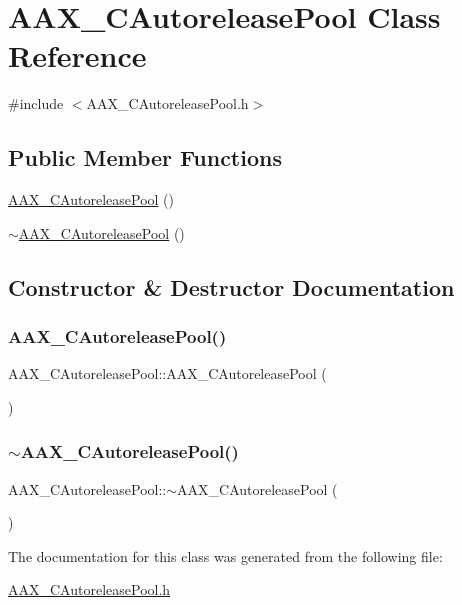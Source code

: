 \hypertarget{a01445}{}\section{A\+A\+X\+\_\+\+C\+Autorelease\+Pool Class Reference}
\label{a01445}


{\ttfamily \#include $<$A\+A\+X\+\_\+\+C\+Autorelease\+Pool.\+h$>$}

\subsection*{Public Member Functions}
\begin{DoxyCompactItemize}
\item 
\mbox{\hyperlink{a01445_a7616cfb07ba64f1aa6e05e5c0a543cd5}{A\+A\+X\+\_\+\+C\+Autorelease\+Pool}} ()
\item 
\mbox{\hyperlink{a01445_a62e9a899ec16ad32e5689b5d65c82546}{$\sim$\+A\+A\+X\+\_\+\+C\+Autorelease\+Pool}} ()
\end{DoxyCompactItemize}


\subsection{Constructor \& Destructor Documentation}
\mbox{\label{a01445_a7616cfb07ba64f1aa6e05e5c0a543cd5}} 
\subsubsection{\texorpdfstring{AAX\_CAutoreleasePool()}{AAX\_CAutoreleasePool()}}
{\footnotesize\ttfamily A\+A\+X\+\_\+\+C\+Autorelease\+Pool\+::\+A\+A\+X\+\_\+\+C\+Autorelease\+Pool (\begin{DoxyParamCaption}{ }\end{DoxyParamCaption})}

\mbox{\label{a01445_a62e9a899ec16ad32e5689b5d65c82546}} 
\subsubsection{\texorpdfstring{$\sim$AAX\_CAutoreleasePool()}{~AAX\_CAutoreleasePool()}}
{\footnotesize\ttfamily A\+A\+X\+\_\+\+C\+Autorelease\+Pool\+::$\sim$\+A\+A\+X\+\_\+\+C\+Autorelease\+Pool (\begin{DoxyParamCaption}{ }\end{DoxyParamCaption})}



The documentation for this class was generated from the following file\+:\begin{DoxyCompactItemize}
\item 
\mbox{\hyperlink{a00407}{A\+A\+X\+\_\+\+C\+Autorelease\+Pool.\+h}}\end{DoxyCompactItemize}

